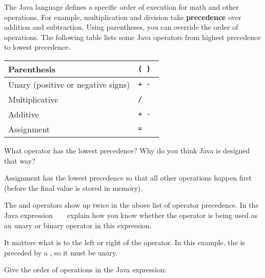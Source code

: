 

The Java language defines a specific order of execution for math and other operations. For example, multiplication and division take \textbf{precedence} over addition and subtraction. Using parentheses, you can override the order of operations.
The following table lists some Java operators from highest precedence to lowest precedence.

\begin{center}
\renewcommand{\arraystretch}{1.5}
\begin{tabular}{|L{3in}|L{1in}|}
\hline
Parenthesis
& \tt ( ) \\
\hline
Unary (positive or negative signs)
& \tt + - \\
\hline
Multiplicative
& \tt * / \\
\hline
Additive
& \tt + - \\
\hline
Assignment
& \tt = \\
\hline
\end{tabular}
\end{center}

%



\Q What operator has the lowest precedence?
Why do you think Java is designed that way?

\begin{answer}
Assignment has the lowest precedence so that all other operations happen first (before the final value is stored in memory).
\end{answer}


\Q The \java{+} and \java{-} operators show up twice in the above list of operator precedence.
In the Java expression ~  ~ explain how you know whether the \java{-} operator is being used as an unary or binary operator in this expression.

\begin{answer}
It matters what is to the left or right of the operator.
In this example, the \java{-} is preceded by a \java{*}, so it must be unary.
\end{answer}


\Q Give the order of operations in the Java expression: ~ 


